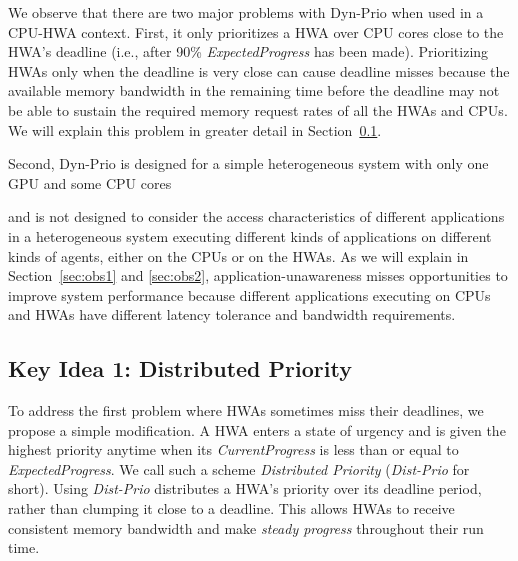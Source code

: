 \documentclass[10pt,letterpaper]{article}
\newif\ifSQUEEZE
\begin{document}
We observe that there are two major problems with \mbox{Dyn-Prio}
when used in a CPU-HWA context.
First, it only prioritizes a HWA over CPU cores close to the HWA's
deadline (i.e., after 90\% \emph{ExpectedProgress} has been made).
Prioritizing HWAs only when the deadline is very close can cause
deadline misses because the available memory bandwidth in the
remaining time before the deadline may not be able to
sustain the required memory request rates of all the HWAs and CPUs.
We will explain this problem in greater detail in Section~\ref{sec:distprio}.
\ifSQUEEZE
Second, Dyn-Prio is designed for a simple heterogeneous CPU-GPU system
\else
Second, Dyn-Prio is designed for a simple heterogeneous system
with only one GPU and some CPU cores 
\fi
and is not designed to
consider the access characteristics of different applications
in a heterogeneous system executing different kinds of
applications on different kinds of agents, either on the CPUs or on the HWAs.
As we will explain in
Section~\ref{sec:obs1} and \ref{sec:obs2}, application-unawareness
misses opportunities to improve system performance because
different applications executing on CPUs and HWAs have different
latency tolerance and bandwidth requirements.

\subsection{Key Idea 1: Distributed Priority}
\label{sec:distprio}

To address the first problem where HWAs sometimes miss their deadlines, we
propose a simple modification.  A HWA enters a state of urgency and is given the
highest priority anytime when its \emph{CurrentProgress} is less than or equal
to \emph{ExpectedProgress}. We call such a scheme \emph{Distributed Priority}
(\emph{Dist-Prio} for short). Using \emph{Dist-Prio} distributes a HWA's
priority over its deadline period, rather than clumping it close to a deadline.
This allows HWAs to receive consistent memory bandwidth and make \emph{steady progress}
throughout their run time.
\end{document}
